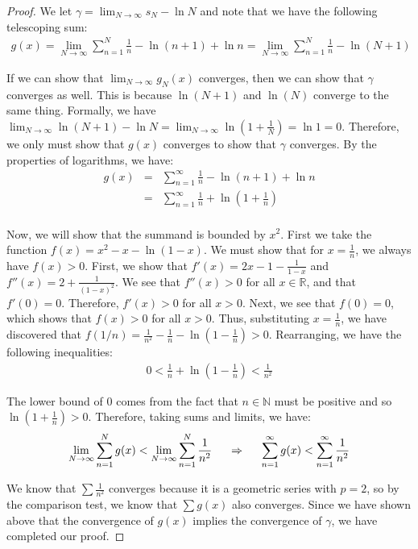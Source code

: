 \documentclass[psamsfonts]{amsart}
\theoremstyle{definition}
\theoremstyle{remark}
\numberwithin{equation}{section}
\begin{document}
\begin{proof}
We let $\gamma = \lim_{N \to \infty} s_N - \ln N$ and note that we have the following telescoping sum:
\begin{eqnarray}
g(x) = \lim_{N \to \infty} \sum_{n=1}^N \frac{1}{n} - \ln( n+1) + \ln n = \lim_{N \to \infty} \sum_{n=1}^N \frac{1}{n} - \ln(N+1)
\end{eqnarray}

If we can show that $\lim_{N \to \infty} g_N (x)$ converges, then we can show that $\gamma$ converges as well. This is because $\ln(N+1)$ and $\ln(N)$ converge to the same thing. Formally, we have $\lim_{N \to \infty} \ln(N+1) - \ln N = \lim_{N \to \infty} \ln(1 + \frac{1}{N} ) = \ln 1 = 0$. Therefore, we only must show that $g(x)$ converges to show that $\gamma$ converges. By the properties of logarithms, we have:
\begin{eqnarray}
g(x) &=& \sum_{n=1}^\infty \frac{1}{n} - \ln(n+1) + \ln n \\
&=& \sum_{n=1}^\infty \frac{1}{n} + \ln \left(1 + \frac{1}{n} \right) \\
\end{eqnarray}

Now, we will show that the summand is bounded by $x^2$. First we take the function $f(x) = x^2 - x - \ln( 1- x)$. We must show that for $x = \frac{1}{n}$, we always have $f(x) > 0$. First, we show that $f'(x) = 2x - 1 - \frac{1}{1-x}$ and $f''(x) = 2 + \frac{1}{(1-x)^2}$. We see that $f''(x) > 0$ for all $x \in \mathbb{R}$, and that $f'(0) = 0$. Therefore, $f'(x) > 0$ for all $x > 0$. Next, we see that $f(0) = 0$, which shows that $f(x) > 0$ for all $x > 0$. Thus, substituting $x = \frac{1}{n}$, we have discovered that $f(1/n) = \frac{1}{n^2} - \frac{1}{n} - \ln(1 - \frac{1}{n} ) > 0$. Rearranging, we have the following inequalities:
\begin{eqnarray}
0 < \frac{1}{n} + \ln \left(1 - \frac{1}{n} \right) < \frac{1}{n^2}
\end{eqnarray}

The lower bound of $0$ comes from the fact that $n \in \mathbb{N}$ must be positive and so $\ln(1 + \frac{1}{n}) > 0$. Therefore, taking sums and limits, we have:
\begin{eqnarray}
\lim_{N \to \infty} \sum_{n=1}^N g(x) < \lim_{N \to \infty} \sum_{n=1}^N \frac{1}{n^2} \hspace{0.5cm} \Rightarrow \hspace{0.5cm} \sum_{n=1}^\infty g(x) < \sum_{n=1}^\infty \frac{1}{n^2} 
\end{eqnarray} 

We know that $\sum \frac{1}{n^2}$ converges because it is a geometric series with $p = 2$, so by the comparison test, we know that $\sum g(x)$ also converges. Since we have shown above that the convergence of $g(x)$ implies the convergence of $\gamma$, we have completed our proof.
\end{proof}
\end{document}

